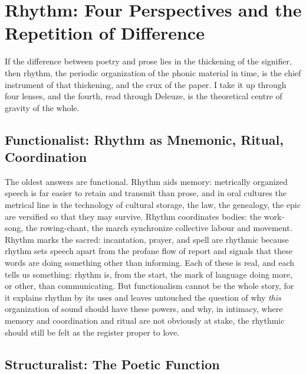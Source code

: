\section{Rhythm: Four Perspectives and the Repetition of Difference}\label{p08:sec:rhythm}

If the difference between poetry and prose lies in the thickening of the signifier, then rhythm, the periodic organization of the phonic material in time, is the chief instrument of that thickening, and the crux of the paper. I take it up through four lenses, and the fourth, read through Deleuze, is the theoretical centre of gravity of the whole.

\subsection{Functionalist: Rhythm as Mnemonic, Ritual, Coordination}

The oldest answers are functional. Rhythm aids memory: metrically organized speech is far easier to retain and transmit than prose, and in oral cultures the metrical line is the technology of cultural storage, the law, the genealogy, the epic are versified so that they may survive. Rhythm coordinates bodies: the work-song, the rowing-chant, the march synchronize collective labour and movement. Rhythm marks the sacred: incantation, prayer, and spell are rhythmic because rhythm sets speech apart from the profane flow of report and signals that these words are doing something other than informing. Each of these is real, and each tells us something: rhythm is, from the start, the mark of language doing more, or other, than communicating. But functionalism cannot be the whole story, for it explains rhythm by its uses and leaves untouched the question of why \emph{this} organization of sound should have these powers, and why, in intimacy, where memory and coordination and ritual are not obviously at stake, the rhythmic should still be felt as the register proper to love.

\subsection{Structuralist: The Poetic Function}

